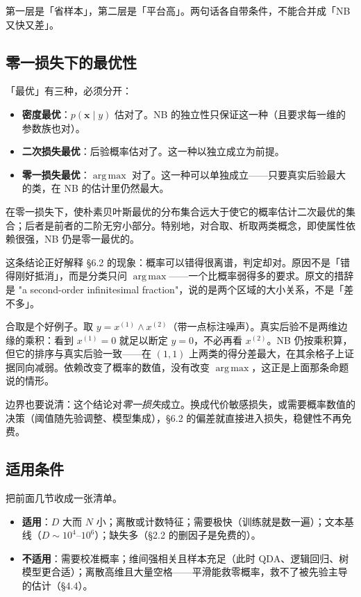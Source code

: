 \documentclass[11pt,a4paper,fontset=windows,zihao=-4]{ctexart}
\newcommand{\bx}{\mathbf{x}}
\DeclareMathOperator*{\argmax}{arg\,max}
\begin{document}
第一层是「省样本」，第二层是「平台高」。两句话各自带条件，不能合并成「NB 又快又差」。

\subsection{零一损失下的最优性}

「最优」有三种，必须分开：

\begin{itemize}
  \item \textbf{密度最优}：$p(\bx\mid y)$ 估对了。NB 的独立性只保证这一种（且要求每一维的参数族也对）。
  \item \textbf{二次损失最优}：后验概率估对了。这一种以独立成立为前提。
  \item \textbf{零一损失最优}：$\argmax$ 对了。这一种可以单独成立——只要真实后验最大的类，在 NB 的估计里仍然最大。
\end{itemize}

\begin{prop}
在零一损失下，使朴素贝叶斯最优的分布集合远大于使它的概率估计二次最优的集合；后者是前者的二阶无穷小部分。特别地，对合取、析取两类概念，即使属性依赖很强，NB 仍是零一最优的。
\end{prop}

这条结论正好解释 §6.2 的现象：概率可以错得很离谱，判定却对。原因不是「错得刚好抵消」，而是分类只问 $\argmax$——一个比概率弱得多的要求。原文的措辞是 "a second-order infinitesimal fraction"，说的是两个区域的大小关系，不是「差不多」。

合取是个好例子。取 $y=x^{(1)}\wedge x^{(2)}$（带一点标注噪声）。真实后验不是两维边缘的乘积：看到 $x^{(1)}=0$ 就足以断定 $y=0$，不必再看 $x^{(2)}$。NB 仍按乘积算，但它的排序与真实后验一致——在 $(1,1)$ 上两类的得分差最大，在其余格子上证据同向减弱。依赖改变了概率的数值，没有改变 $\argmax$，这正是上面那条命题说的情形。

边界也要说清：这个结论对\emph{零一损失}成立。换成代价敏感损失，或需要概率数值的决策（阈值随先验调整、模型集成），§6.2 的偏差就直接进入损失，稳健性不再免费。

\subsection{适用条件}

把前面几节收成一张清单。

\begin{itemize}
  \item \textbf{适用}：$D$ 大而 $N$ 小；离散或计数特征；需要极快（训练就是数一遍）；文本基线（$D\sim10^4$–$10^6$）；缺失多（§2.2 的删因子是免费的）。
  \item \textbf{不适用}：需要校准概率；维间强相关且样本充足（此时 QDA、逻辑回归、树模型更合适）；离散高维且大量空格——平滑能救零概率，救不了被先验主导的估计（§4.4）。
\end{itemize}
\end{document}

